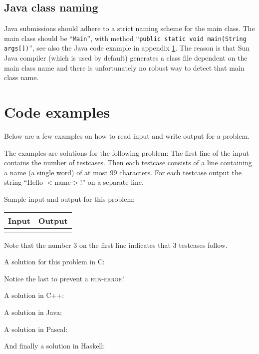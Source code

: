\subsection{Java class naming}

Java submissions should adhere to a strict naming scheme for the main
class. The main class should be ``\verb!Main!'', with method
``\verb!public static void main(String args[])!'', see also the Java
code example in appendix \ref{codeexamples}. The reason is that Sun
Java compiler (which is used by default) generates a class file
dependent on the main class name and there is unfortunately no robust
way to detect that main class name.

\newpage
\appendix

\section{Code examples}\label{codeexamples}

Below are a few examples on how to read input and write output for a
problem.

The examples are solutions for the following problem: The first line
of the input contains the number of testcases. Then each testcase
consists of a line containing a name (a single word) of at most 99
characters. For each testcase output the string ``Hello $<$name$>$!''
on a separate line.

Sample input and output for this problem:

\begin{tabular}{|p{}|p{}|}
\hline
\textbf{Input} & \textbf{Output} \\
\hline
 &
 \\
\hline
\end{tabular}

Note that the number 3 on the first line indicates that 3 testcases
follow.

A solution for this problem in C:

Notice the last  to prevent a \textsc{run-error}!

\newpage

A solution in C++:

A solution in Java:

\newpage

A solution in Pascal:

And finally a solution in Haskell:


